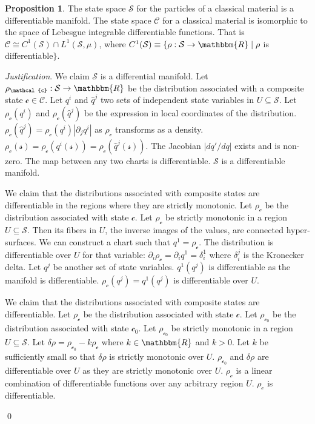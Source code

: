 \documentclass[aps,pra,10pt,twocolumn,floatfix,nofootinbib]{revtex4-1}
\numberwithin{equation}{section}
\theoremstyle{definition}
\newtheorem{prop}[equation]{Proposition}
\newenvironment{justification}{\emph{Justification}.}{\qed}
\begin{document}
\begin{prop}\label{differentiable_manifold}
	The state space $\mathcal{S}$ for the particles of a  classical material is a differentiable manifold. The state space $\mathcal{C}$ for a classical material is isomorphic to the space of Lebesgue integrable differentiable functions. That is $\mathcal{C} \cong C^1(\mathcal{S}) \cap L^1(\mathcal{S}, \mu)$, where $C^1(\mathcal{S}) \equiv \{\rho:\mathcal{S} \rightarrow \mathbbm{R} \; | \; \rho$ is differentiable$\}$.
\end{prop}
\begin{justification}
	We claim $\mathcal{S}$ is a differential manifold. Let $\rho_\mathcal{c} : \mathcal{S} \rightarrow \mathbbm{R}$ be the distribution associated with a composite state $\mathcal{c} \in \mathcal{C}$. Let $q^i$ and $\hat{q}^j$ two sets of independent state variables in $U\subseteq \mathcal{S}$. Let $\rho_\mathcal{c}(q^i)$ and $\rho_\mathcal{c}(\hat{q}^j)$ be the expression in local coordinates of the distribution.  $\rho_\mathcal{c}(\hat{q}^j)=\rho_\mathcal{c}(q^i) | \partial_j q^i |$ as $\rho_\mathcal{c}$ transforms as a density. $\rho_\mathcal{c}(\mathcal{s}) = \rho_\mathcal{c}(q^i(\mathcal{s})) = \rho_\mathcal{c}(\hat{q}^j(\mathcal{s}))$. The Jacobian $| d q' / d q |$ exists and is non-zero. The map between any two charts is differentiable. $\mathcal{S}$ is a differentiable manifold.
	
	We claim that the distributions associated with composite states are differentiable in the regions where they are strictly monotonic. Let $\rho_\mathcal{c}$ be the distribution associated with state $\mathcal{c}$. Let $\rho_\mathcal{c}$ be strictly monotonic in a region $U\subseteq \mathcal{S}$. Then its fibers in $U$, the inverse images of the values, are connected hyper-surfaces. We can construct a chart such that $q^1=\rho_\mathcal{c}$. The distribution is differentiable over $U$ for that variable: $\partial_{i} \rho_\mathcal{c} = \partial_{i} q^1 = \delta_i^1$ where $\delta_i^j$ is the Kronecker delta. Let $q^{j}$ be another set of state variables. $q^1(q^{j})$ is differentiable as the manifold is differentiable. $\rho_\mathcal{c}(q^{j})=q^1(q^{j})$ is differentiable over $U$.
	
	We claim that the distributions associated with composite states are differentiable. Let $\rho_\mathcal{c}$ be the distribution associated with state $\mathcal{c}$. Let $\rho_{\mathcal{c}_0}$ be the distribution associated with state $\mathcal{c}_0$. Let $\rho_{\mathcal{c}_0}$ be strictly monotonic in a region $U\subseteq \mathcal{S}$. Let $\delta \rho = \rho_{\mathcal{c}_0} - k \rho_{\mathcal{c}}$ where $k \in \mathbbm{R}$ and $k>0$. Let $k$ be sufficiently small so that $\delta \rho$ is strictly monotonic over $U$. $\rho_{\mathcal{c}_0}$ and $\delta \rho$ are differentiable over $U$ as they are strictly monotonic over $U$. $\rho_{\mathcal{c}}$ is a linear combination of differentiable functions over any arbitrary region $U$. $\rho_{\mathcal{c}}$ is differentiable.
	

\end{justification}
\end{document}

